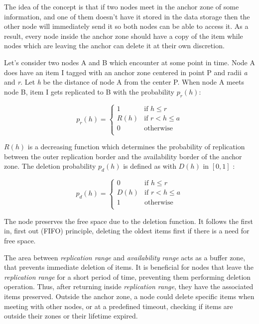 The idea of the concept is that if two nodes meet in the anchor zone of some
information, and one of them doesn't have it stored in the data storage then the
other node will immediately send it so both nodes can be able to access it. As a
result, every node inside the anchor zone should have a copy of the item while
nodes which are leaving the anchor can delete it at their own discretion.

Let's consider two nodes A and B which encounter at some point in time. Node A
does have an item I tagged with an anchor zone centered in point P and radii
{\it a} and {\it r}. Let {\it h} be the distance of node A from the center P.
When node A meets node B, item I gets replicated to B with the probability
$p_r(h)$:

$$p_r(h) = \begin{cases}
	1 & \text{if } h \leq r \\
	R\left(h\right) & \text{if } r < h \leq a \\
	0 & \text{otherwise} \\
\end{cases}$$

$R(h)$ is a decreasing function which determines the probability of replication
between the outer replication border and the availability border of the anchor
zone.
The deletion probability $p_d(h)$ is defined as with $D(h)$ in $[0, 1]$ :

$$p_d(h) = \begin{cases}
	0 & \text{if } h \leq r \\
	D\left(h\right) & \text{if } r < h \leq a \\
	1 & \text{otherwise} \\
\end{cases}$$

The node preserves the free space due to the deletion function. It follows the
first in, first out (FIFO) principle, deleting the oldest items first if there
is a need for free space.

The area between {\it replication range} and {\it availability range} acts as a
buffer zone, that prevents immediate deletion of items. It is beneficial
for nodes that leave the {\it replication range} for a short period of time,
preventing them performing deletion operation. Thus, after returning inside
{\it replication range}, they have the associated items preserved. Outside the
anchor zone, a node could delete specific items when meeting with other nodes,
or at a predefined timeout, checking if items are outside their zones or their
lifetime expired.

